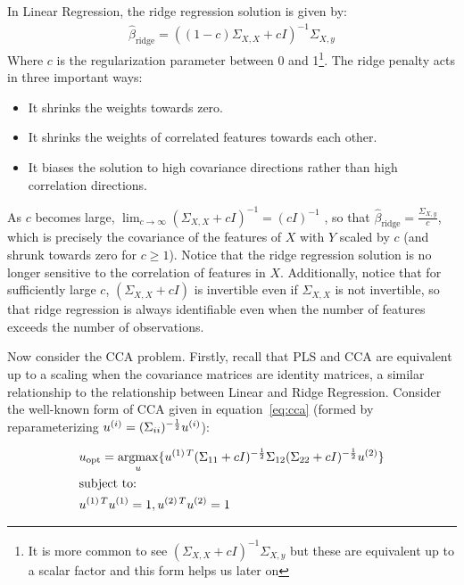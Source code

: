In Linear Regression, the ridge regression solution is given by:
\begin{align}
    \hat{\beta}_{\text{ridge}} = ((1-c)\Sigma_{X,X} + c I)^{-1} \Sigma_{X,y}
\end{align}
Where \(c\) is the regularization parameter between 0 and 1\footnote{It is more common to see $(\Sigma_{X,X} + c I)^{-1} \Sigma_{X,y}$ but these are equivalent up to a scalar factor and this form helps us later on}.
The ridge penalty acts in three important ways:
\begin{itemize}
    \item It shrinks the \gls{weights} towards zero.
    \item It shrinks the \gls{weights} of correlated features towards each other.
    \item It biases the solution to high covariance directions rather than high correlation directions.
\end{itemize}

As $c$ becomes large, $\lim_{c \to \infty} (\Sigma_{X,X} + c I)^{-1} = (c I)^{-1}$
, so that $\hat{\beta}_{\text{ridge}}=\frac{\Sigma_{X,y}}{c}$, which is precisely the covariance of the features of $X$ with $Y$ scaled by $c$ (and shrunk towards zero for $c \geq 1$).
Notice that the ridge regression solution is no longer sensitive to the correlation of features in $X$.
Additionally, notice that for sufficiently large $c$, $(\Sigma_{X,X} + c I)$ is invertible even if $\Sigma_{X,X}$ is not invertible, so that ridge regression is always identifiable even when the number of features exceeds the number of observations.

Now consider the CCA problem.
Firstly, recall that PLS and CCA are equivalent up to a scaling when the covariance matrices are identity matrices, a similar relationship to the relationship between Linear and Ridge Regression.
Consider the well-known form of CCA given in equation~\ref{eq:cca}\citep{mihalik2022canonical} (formed by reparameterizing \(u^{(i)}=(\Sigma_{ii})^{-\frac{1}{2}}u^{(i)}\)):

\begin{align}
    \label{eq:cca}
    & u_{\text{opt}}=\underset{u}{\mathrm{argmax}}\{ u^{(1)\,T}(\Sigma_{11}+ c I)^{-\frac{1}{2}}\Sigma_{12}(\Sigma_{22}+c I)^{-\frac{1}{2}}u^{(2)} \} \\
    & \text{subject to:} \notag \\
    & u^{(1)\,T}u^{(1)}=1, u^{(2)\,T}u^{(2)}=1 \notag
\end{align}

